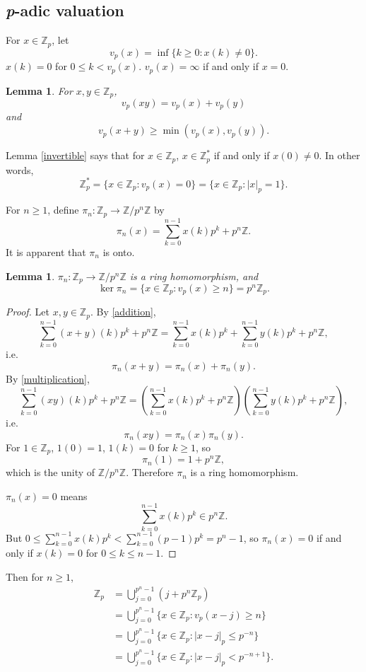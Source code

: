 \documentclass{article}
\newtheorem{lemma}[theorem]{Lemma}
\theoremstyle{definition}
\begin{document}
\subsection{{\em p}-adic valuation}
For $x \in \mathbb{Z}_p$, let
\[
v_p(x) = \inf\{k \geq 0: x(k) \neq 0\}. 
\]
$x(k)=0$ for $0 \leq k < v_p(x)$. $v_p(x) = \infty$ if and only if $x=0$.

\begin{lemma}
For $x,y \in \mathbb{Z}_p$, 
\[
v_p(xy) = v_p(x)+v_p(y)
\]
and
\[
v_p(x+y) \geq \min(v_p(x),v_p(y)).
\]
\end{lemma}

Lemma \ref{invertible} says that for $x \in \mathbb{Z}_p$, $x \in \mathbb{Z}_p^*$ if and only if $x(0) \neq 0$.
In other words, 
\[
\mathbb{Z}_p^* = \{x \in \mathbb{Z}_p : v_p(x) = 0\} = \{x \in \mathbb{Z}_p : |x|_p = 1\}.
\]

For $n \geq 1$,
define $\pi_n:\mathbb{Z}_p \to \mathbb{Z}/p^n \mathbb{Z}$ by
\[
\pi_n(x) = \sum_{k=0}^{n-1} x(k) p^k + p^n \mathbb{Z}.
\]
It is apparent that $\pi_n$ is onto.

\begin{lemma}
$\pi_n:\mathbb{Z}_p \to \mathbb{Z}/p^n \mathbb{Z}$ is a ring homomorphism,
and
\[
\ker \pi_n = \{x \in \mathbb{Z}_p : v_p(x) \geq n\} = p^n \mathbb{Z}_p.
\]
\end{lemma}
\begin{proof}
Let $x,y \in \mathbb{Z}_p$. By \eqref{addition},
\[
\sum_{k=0}^{n-1} (x+y)(k) p^k + p^n \mathbb{Z} = \sum_{k=0}^{n-1} x(k) p^k + \sum_{k=0}^{n-1} y(k) p^k + p^n \mathbb{Z},
\]
i.e.
\[
\pi_n(x+y) = \pi_n(x)+\pi_n(y).
\]
By \eqref{multiplication},
\[
\sum_{k=0}^{n-1} (xy)(k) p^k + p^n \mathbb{Z} = \left(\sum_{k=0}^{n-1} x(k) p^k + p^n\mathbb{Z} \right)
 \left(\sum_{k=0}^{n-1} y(k) p^k + p^n\mathbb{Z} \right),
\]
i.e.
\[
\pi_n(xy) = \pi_n(x) \pi_n(y).
\]
For $1 \in \mathbb{Z}_p$, $1(0)=1$, $1(k)=0$ for $k \geq 1$, so 
\[
\pi_n(1) = 1 + p^n\mathbb{Z},
\]
which is the unity of $\mathbb{Z}/p^n \mathbb{Z}$. Therefore $\pi_n$ is a ring homomorphism.

$\pi_n(x)=0$ means
\[
\sum_{k=0}^{n-1} x(k) p^k \in p^n \mathbb{Z}.
\]
But $0 \leq \sum_{k=0}^{n-1} x(k) p^k < \sum_{k=0}^{n-1} (p-1) p^k = p^n-1$, so $\pi_n(x)=0$ if and only if 
$x(k)=0$ for $0 \leq k \leq n-1$. 
\end{proof}

Then for $n \geq 1$,
\begin{align*}
\mathbb{Z}_p &= \bigcup_{j=0}^{p^n-1} (j+p^n \mathbb{Z}_p)\\
&=\bigcup_{j=0}^{p^n-1} \{x \in \mathbb{Z}_p: v_p(x-j) \geq n\}\\
&=\bigcup_{j=0}^{p^n-1} \{x \in \mathbb{Z}_p: |x-j|_p \leq p^{-n}\}\\
&=\bigcup_{j=0}^{p^n-1} \{x \in \mathbb{Z}_p: |x-j|_p < p^{-n+1}\}.
\end{align*}
\end{document}
